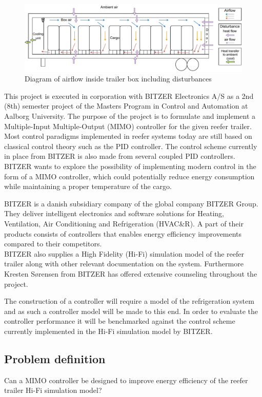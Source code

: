 \begin{figure}[h]
	\centering
	\includegraphics[width = 0.8\linewidth]{Graphics/Trailer_airflow.pdf}
	\caption{Diagram of airflow inside trailer box including disturbances}
	\label{fig:trailer_airflow}
\end{figure}

This project is executed in corporation with BITZER Electronics A/S as a 2nd (8th) semester project of the Masters Program in Control and Automation at Aalborg University. The purpose of the project is to formulate and implement a Multiple-Input Multiple-Output (MIMO) controller for the given reefer trailer. Most control paradigms implemented in reefer systems today are still based on classical control theory such as the PID controller. The control scheme currently in place from BITZER is also made from several coupled PID controllers. BITZER wants to explore the possibility of implementing modern control in the form of a MIMO controller, which could potentially reduce energy consumption while maintaining a proper temperature of the cargo.

BITZER is a danish subsidiary company of the global company BITZER Group. They deliver intelligent electronics and software solutions for Heating, Ventilation, Air Conditioning and Refrigeration (HVAC\&R). A part of their products consists of controllers that enables energy efficiency improvements compared to their competitors. \\

BITZER also supplies a High Fidelity (Hi-Fi) simulation model of the reefer trailer along with other relevant documentation on the system. Furthermore Kresten Sørensen from BITZER has offered extensive counseling throughout the project.

The construction of a controller will require a model of the refrigeration system and as such a controller model will be made to this end. In order to evaluate the controller performance it will be benchmarked against the control scheme currently implemented in the Hi-Fi simulation model by BITZER.

\subsection{Problem definition}
Can a MIMO controller be designed to improve energy efficiency of the reefer trailer Hi-Fi simulation model?